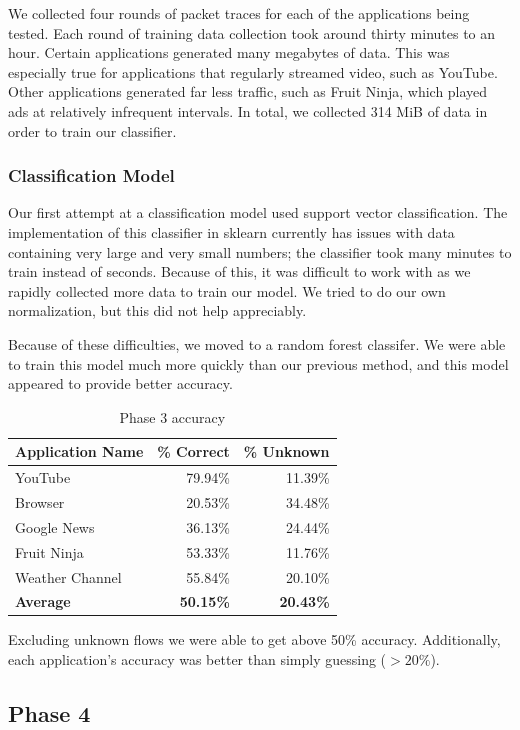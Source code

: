 \documentclass[a4paper, 11pt]{article} %
\begin{document}
We collected four rounds of packet traces for each of the applications being
tested.  Each round of training data collection took around thirty minutes to an
hour. Certain applications generated many megabytes of data. This was especially
true for applications that regularly streamed video, such as YouTube. Other
applications generated far less traffic, such as Fruit Ninja, which played ads
at relatively infrequent intervals. In total, we collected 314 MiB of data in
order to train our classifier.

\subsubsection{Classification Model}

Our first attempt at a classification model used support vector
classification. The implementation of this classifier in sklearn currently has
issues with data containing very large and very small numbers; the classifier
took many minutes to train instead of seconds. Because of this, it was difficult
to work with as we rapidly collected more data to train our model. We tried to
do our own normalization, but this did not help appreciably.

Because of these difficulties, we moved to a random forest classifer. We were
able to train this model much more quickly than our previous method, and this
model appeared to provide better accuracy.

\begin{table}[h]
	\centering
	\begin{tabular}{l r r}
		Application Name & \% Correct & \% Unknown \\
		\hline
		YouTube & 79.94\% & 11.39\% \\
		Browser & 20.53\% & 34.48\% \\
		Google News & 36.13\% & 24.44\% \\
		Fruit Ninja & 53.33\% & 11.76\% \\
		Weather Channel & 55.84\% & 20.10\% \\
		\textbf{Average} & \textbf{50.15\%} & \textbf{20.43\%} \\
	\end{tabular}
	\caption{Phase 3 accuracy}
\end{table}

Excluding unknown flows we were able to get above 50\% accuracy. Additionally,
each application's accuracy was better than simply guessing ($> 20\%$).

\subsection{Phase 4}
\end{document}
